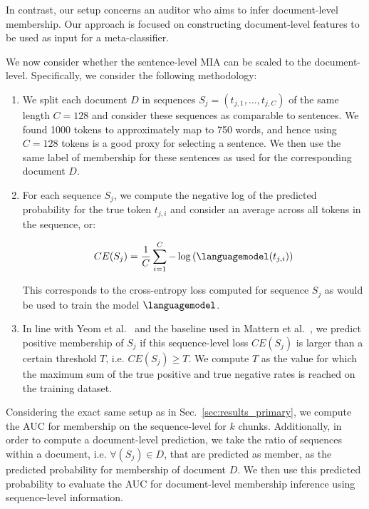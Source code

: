 \documentclass[twocolumn,10pt]{article}
\begin{document}
In contrast, our setup concerns an auditor who aims to infer document-level membership. Our approach is focused on constructing document-level features to be used as input for a meta-classifier. 

We now consider whether the sentence-level MIA can be scaled to the document-level. Specifically, we consider the following methodology:
\begin{enumerate}
    \item We split each document $D$ in sequences $S_j = (t_{j,1}, \ldots, t_{j,C})$ of the same length $C=128$ and consider these sequences as comparable to sentences. We found 1000 tokens to approximately map to 750 words, and hence using $C=128$ tokens is a good proxy for selecting a sentence. We then use the same label of membership for these sentences as used for the corresponding document $D$. 
    \item For each sequence $S_j$, we compute the negative log of the predicted probability for the true token $t_{j,i}$ and consider an average across all tokens in the sequence, or:

    \begin{align}
        CE(S_j) = \frac{1}{C}\sum_{i=1}^{C} -\log \left(\languagemodel(t_{j,i})\right) 
    \end{align}

    This corresponds to the cross-entropy loss computed for sequence $S_j$ as would be used to train the model $\languagemodel$.

    \item In line with Yeom et al.~\cite{yeom2018privacy} and the baseline used in Mattern et al.~\cite{mattern2023membership}, we predict positive membership of $S_j$ if this sequence-level loss $CE(S_j)$ is larger than a certain threshold $T$, i.e. $CE(S_j) \geq T$. We compute $T$ as the value for which the maximum sum of the true positive and true negative rates is reached on the training dataset. 
\end{enumerate}

Considering the exact same setup as in Sec.~\ref{sec:results_primary}, we compute the AUC for membership on the sequence-level for $k$ chunks. Additionally, in order to compute a document-level prediction, we take the ratio of sequences within a document, i.e. $\forall (S_j) \in D$, that are predicted as member, as the predicted probability for membership of document $D$. We then use this predicted probability to evaluate the AUC for document-level membership inference using sequence-level information. 
\end{document}
